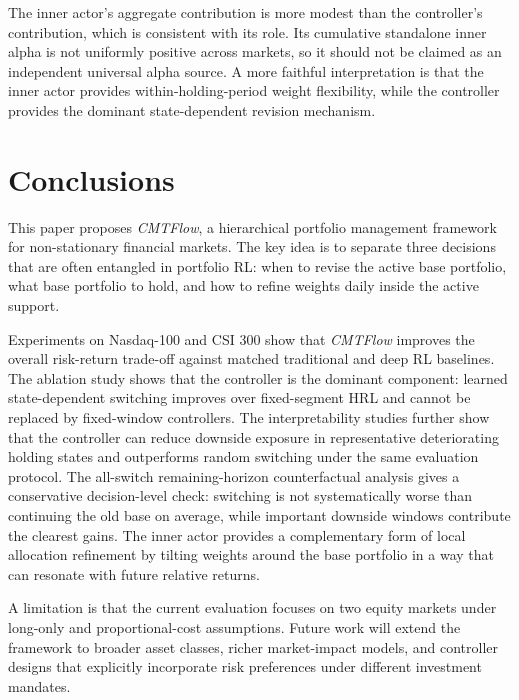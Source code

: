 \documentclass[letterpaper]{article} %
\begin{document}
The inner actor's aggregate contribution is more modest than the controller's contribution, which is consistent with its role. Its cumulative standalone inner alpha is not uniformly positive across markets, so it should not be claimed as an independent universal alpha source. A more faithful interpretation is that the inner actor provides within-holding-period weight flexibility, while the controller provides the dominant state-dependent revision mechanism.

\FloatBarrier

\section{Conclusions}

This paper proposes \textit{CMTFlow}, a hierarchical portfolio management framework for non-stationary financial markets. The key idea is to separate three decisions that are often entangled in portfolio RL: when to revise the active base portfolio, what base portfolio to hold, and how to refine weights daily inside the active support.

Experiments on Nasdaq-100 and CSI 300 show that \textit{CMTFlow} improves the overall risk-return trade-off against matched traditional and deep RL baselines. The ablation study shows that the controller is the dominant component: learned state-dependent switching improves over fixed-segment HRL and cannot be replaced by fixed-window controllers. The interpretability studies further show that the controller can reduce downside exposure in representative deteriorating holding states and outperforms random switching under the same evaluation protocol. The all-switch remaining-horizon counterfactual analysis gives a conservative decision-level check: switching is not systematically worse than continuing the old base on average, while important downside windows contribute the clearest gains. The inner actor provides a complementary form of local allocation refinement by tilting weights around the base portfolio in a way that can resonate with future relative returns.

A limitation is that the current evaluation focuses on two equity markets under long-only and proportional-cost assumptions. Future work will extend the framework to broader asset classes, richer market-impact models, and controller designs that explicitly incorporate risk preferences under different investment mandates.

\FloatBarrier
\raggedbottom

\end{document}
